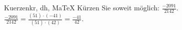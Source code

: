 \begin{MAufgabe}{Kuerzen}{kr, dh, MaTeX}
K\"urzen Sie soweit m\"oglich: $\frac{-2091}{2142}$.\\ 
\ifLsg\MLoesung
\quad $\frac{-2091}{2142}=\frac{(51)\cdot(-41)}{(51)\cdot(42)}=\frac{-41}{42}$.\else\relax\fi
 \end{MAufgabe}